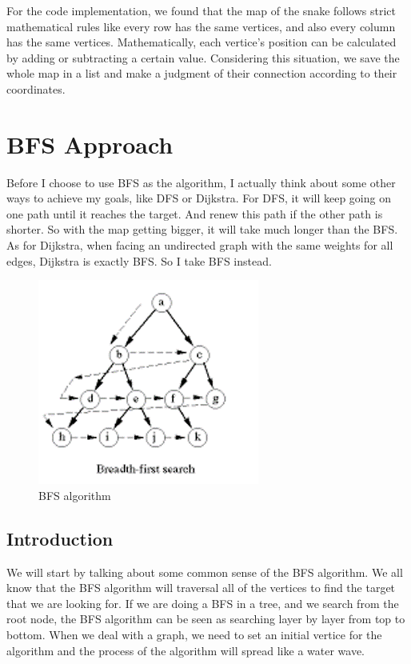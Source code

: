 \documentclass[12pt]{article}
\begin{document}
For the code implementation, we found that the map of the snake follows strict mathematical rules like every row has the same vertices, and also every column has the same vertices. Mathematically, each vertice's position can be calculated by adding or subtracting a certain value. Considering this situation, we save the whole map in a list and make a judgment of their connection according to their coordinates.

\section{BFS Approach}
Before I choose to use BFS as the algorithm, I actually think about some other ways to achieve my goals, like DFS or Dijkstra. For DFS, it will keep going on one path until it reaches the target. And renew this path if the other path is shorter. So with the map getting bigger, it will take much longer than the BFS. As for Dijkstra, when facing an undirected graph with the same weights for all edges, Dijkstra is exactly BFS. So I take BFS instead.

\begin{figure}[H]
    \centering 
    \includegraphics[scale = 0.8]{1.png}
    \caption{BFS algorithm}
    \label{fig:figure1}
\end{figure}

\subsection{Introduction}
We will start by talking about some common sense of the BFS algorithm. We all know that the BFS algorithm will traversal all of the vertices to find the target that we are looking for. If we are doing a BFS in a tree, and we search from the root node, the BFS algorithm can be seen as searching layer by layer from top to bottom. When we deal with a graph, we need to set an initial vertice for the algorithm and the process of the algorithm will spread like a water wave.
\end{document}
